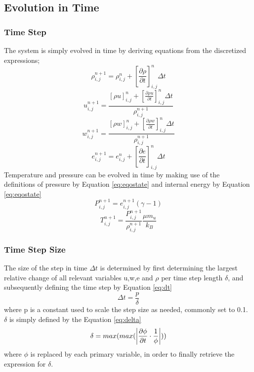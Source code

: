\documentclass[10pt, nofootinbib, twocolumn]{revtex4-1}
\begin{document}
\subsection{Evolution in Time}
\subsubsection{Time Step}
The system is simply evolved in time by deriving equations from the discretized expressions; \\
\begin{equation}\label{eq:rho_e}
    \rho_{i,j}^{n+1} = \rho_{i,j}^{n}+\left[\frac{\partial \rho }{\partial t}\right]^{n}_{i,j} \Delta t
\end{equation}
\begin{equation}\label{eq:u_e}
    u_{i,j}^{n+1} = \frac{[\rho u]_{i,j}^n+\left[\frac{\partial \rho u}{\partial t}\right]^{n}_{i,j}\Delta t}{\rho_{i,j}^{n+1}}
\end{equation}
\begin{equation}\label{eq:w_e}
    w_{i,j}^{n+1} = \frac{[\rho w]_{i,j}^n+\left[\frac{\partial \rho w}{\partial t}\right]^{n}_{i,j}\Delta t}{\rho_{i,j}^{n+1}}
\end{equation}
\begin{equation}\label{eq:e_e}
    e_{i,j}^{n+1} = e_{i,j}^{n} + \left[\frac{\partial e}{\partial t}\right]^{n}_{i,j} \Delta t
\end{equation}
Temperature and pressure can be evolved in time by making use of the definitions of pressure by Equation \eqref{eq:eqostate} and internal energy by Equation \eqref{eq:eqostate}
\begin{equation}
    P_{i,j}^{n+1}=e_{i,j}^{n+1}(\gamma-1)
\end{equation}
\begin{equation}
    T_{i,j}^{n+1}=\frac{P_{i,j}^{n+1}}{\rho_{i,j}^{n+1}}\frac{\mu m_u}{k_B}
\end{equation}

\subsubsection{Time Step Size}
The size of the step in time $\Delta t$ is determined by first determining the largest relative change of all relevant variables u,w,e and $\rho$ per time step length $\delta$, and subsequently defining the time step by Equation \eqref{eq:dt}
\begin{equation}\label{eq:dt}
    \Delta t = \frac{p}{\delta}
\end{equation}
where p is a constant used to scale the step size as needed, commonly set to 0.1. $\delta$ is simply defined by the Equation \eqref{eq:delta}
\begin{equation}\label{eq:delta}
    \delta = max(max(\abs{\frac{\partial \phi}{\partial t}\cdot\frac{1}{\phi}}))
\end{equation}
where $\phi$ is replaced by  each primary variable, in order to finally retrieve the expression for $\delta$. 
\end{document}
